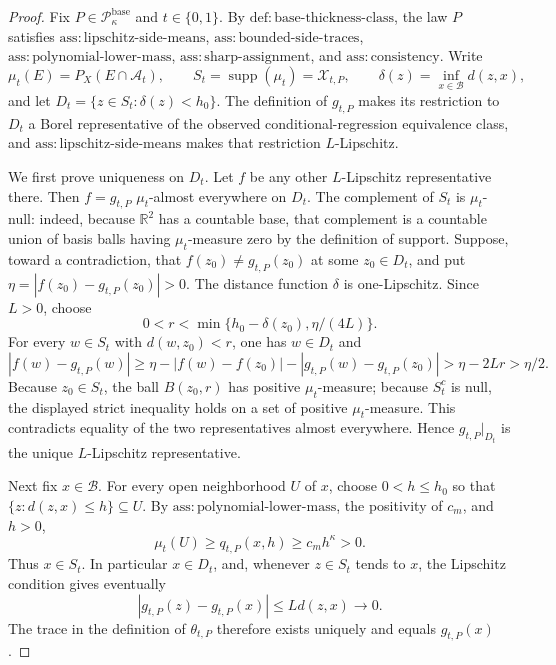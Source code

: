 \documentclass{article}
\begin{document}
\begin{proof}
Fix \(P\in\mathcal P_{\kappa}^{\mathrm{base}}\) and \(t\in\{0,1\}\). By \(\mathrm{def:base\text{-}thickness\text{-}class}\), the law \(P\) satisfies \(\mathrm{ass:lipschitz\text{-}side\text{-}means}\), \(\mathrm{ass:bounded\text{-}side\text{-}traces}\), \(\mathrm{ass:polynomial\text{-}lower\text{-}mass}\), \(\mathrm{ass:sharp\text{-}assignment}\), and \(\mathrm{ass:consistency}\). Write
\[
 \mu_t(E)=P_X(E\cap\mathcal A_t),\qquad
 S_t=\operatorname{supp}(\mu_t)=\mathcal X_{t,P},\qquad
 \delta(z)=\inf_{x\in\mathcal B}d(z,x),
\]
and let \(D_t=\{z\in S_t:\delta(z)<h_0\}\). The definition of \(g_{t,P}\) makes its restriction to \(D_t\) a Borel representative of the observed conditional-regression equivalence class, and \(\mathrm{ass:lipschitz\text{-}side\text{-}means}\) makes that restriction \(L\)-Lipschitz.

We first prove uniqueness on \(D_t\). Let \(f\) be any other \(L\)-Lipschitz representative there. Then \(f=g_{t,P}\) \(\mu_t\)-almost everywhere on \(D_t\). The complement of \(S_t\) is \(\mu_t\)-null: indeed, because \(\mathbb R^2\) has a countable base, that complement is a countable union of basis balls having \(\mu_t\)-measure zero by the definition of support. Suppose, toward a contradiction, that \(f(z_0)\ne g_{t,P}(z_0)\) at some \(z_0\in D_t\), and put \(\eta=|f(z_0)-g_{t,P}(z_0)|>0\). The distance function \(\delta\) is one-Lipschitz. Since \(L>0\), choose
\[
 0<r<\min\{h_0-\delta(z_0),\eta/(4L)\}.
\]
For every \(w\in S_t\) with \(d(w,z_0)<r\), one has \(w\in D_t\) and
\[
 |f(w)-g_{t,P}(w)|
 \ge \eta-|f(w)-f(z_0)|-|g_{t,P}(w)-g_{t,P}(z_0)|
 >\eta-2Lr>\eta/2.
\]
Because \(z_0\in S_t\), the ball \(B(z_0,r)\) has positive \(\mu_t\)-measure; because \(S_t^c\) is null, the displayed strict inequality holds on a set of positive \(\mu_t\)-measure. This contradicts equality of the two representatives almost everywhere. Hence \(g_{t,P}|_{D_t}\) is the unique \(L\)-Lipschitz representative.

Next fix \(x\in\mathcal B\). For every open neighborhood \(U\) of \(x\), choose \(0<h\le h_0\) so that \(\{z:d(z,x)\le h\}\subseteq U\). By \(\mathrm{ass:polynomial\text{-}lower\text{-}mass}\), the positivity of \(c_m\), and \(h>0\),
\[
 \mu_t(U)\ge q_{t,P}(x,h)\ge c_mh^\kappa>0.
\]
Thus \(x\in S_t\). In particular \(x\in D_t\), and, whenever \(z\in S_t\) tends to \(x\), the Lipschitz condition gives eventually
\[
 |g_{t,P}(z)-g_{t,P}(x)|\le Ld(z,x)\longrightarrow0.
\]
The trace in the definition of \(\theta_{t,P}\) therefore exists uniquely and equals \(g_{t,P}(x)\).


\end{proof}
\end{document}
